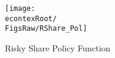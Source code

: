 \begin{figure}[]
	\centerline{\texttt{[image: \\econtexRoot/\\FigsRaw/RShare\_Pol]}}
	\caption{Risky Share Policy Function}
	\label{fig:RSharePol}
\end{figure}
